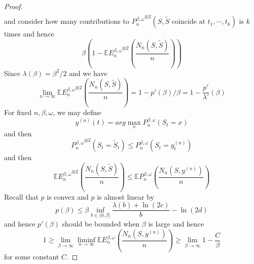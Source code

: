 \begin{proof}
\[\begin{aligned}
    \end{aligned}
    \]
    and consider how many contributions to ${P_n^{\beta,\omega}}^{\otimes 2}(S,\tilde{S}\text{ coincide at }t_1,\cdots,t_k)$ is $k$ times and hence
    \[
    \beta\left(1 - \mathbb{E}{ E_n^{\beta,\omega}}^{\otimes 2}\left(\dfrac{N_n(S,\tilde{S})}{n}\right)\right)
    \]
    Since $\lambda(\beta) = \beta^2/2$ and we have
    \[
    \lim_{n\to\infty}\mathbb{E}{E_n^{\beta,\omega}}^{\otimes 2}\left(\dfrac{N_n(S,\tilde{S})}{n}\right) = 1 - p'(\beta)/\beta = 1 -\dfrac{p'}{\lambda '}(\beta)
    \]
    For fixed $n,\beta,\omega$, we may define
    \[
    y^{(n)}(t) = arg\max_{x} P_n^{\beta,\omega}(S_t = x)
    \]
    and then
    \[
    {P_n^{\beta,\omega}}^{\otimes 2}(S_t = \tilde{S}_t) \leq P_n^{\beta,\omega}(S_t = y_t^{(n)})
    \]
    and then
    \[
    \mathbb{E}{E_n^{\beta,\omega}}^{\otimes 2}\left(\dfrac{N_n(S,\tilde{S})}{n}\right) \leq \mathbb{E}P_n^{\beta,\omega}\left(\dfrac{N_n(S,y^{(n)})}{n}\right)
    \]
    Recall that $p$ is convex and $p$ is almost linear by
    \[
    p(\beta) \leq \beta\inf_{b\in(0,\beta]}\dfrac{\lambda(b)+\ln(2c)}{b} - \ln(2d)
    \]
    and hence $p'(\beta)$ should be bounded when $\beta$ is large and hence
    \[
    1\geq \lim_{\beta\to\infty} \liminf_{n\to\infty} \mathbb{E}E_n^{\beta,\omega}\left(\dfrac{N_n(S,y^{(n)})}{n}\right) \geq \lim_{\beta\to \infty} 1 - \dfrac{C}{\beta}
    \]
    for some constant $C$.
\end{proof}


